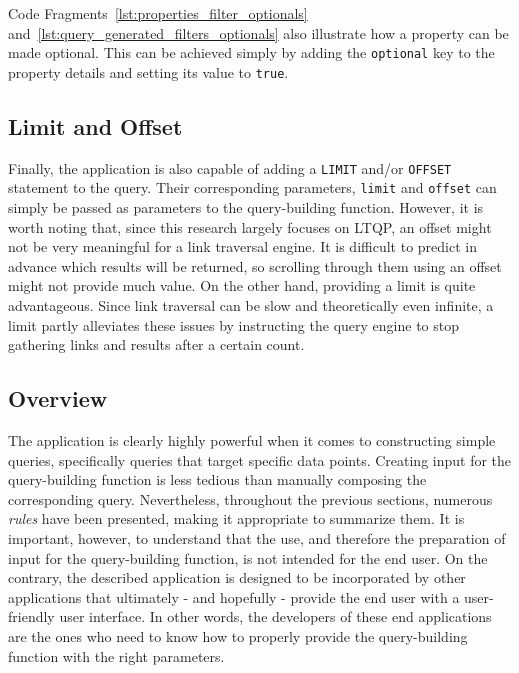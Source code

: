 Code Fragments~\ref{lst:properties_filter_optionals} and~\ref{lst:query_generated_filters_optionals} also illustrate how a property can be made optional. This can be achieved simply by adding the \texttt{optional} key to the property details and setting its value to \texttt{true}.

\subsection{Limit and Offset}
\label{subsec:limit_offset}

Finally, the application is also capable of adding a \texttt{LIMIT} and/or \texttt{OFFSET} statement to the query. Their corresponding parameters, \texttt{limit} and \texttt{offset} can simply be passed as parameters to the query-building function. However, it is worth noting that, since this research largely focuses on LTQP, an offset might not be very meaningful for a link traversal engine. It is difficult to predict in advance which results will be returned, so scrolling through them using an offset might not provide much value. On the other hand, providing a limit is quite advantageous. Since link traversal can be slow and theoretically even infinite, a limit partly alleviates these issues by instructing the query engine to stop gathering links and results after a certain count.

\subsection{Overview}
\label{subsec:building_queries_predicate_sequences_overview}

The application is clearly highly powerful when it comes to constructing simple queries, specifically queries that target specific data points. Creating input for the query-building function is less tedious than manually composing the corresponding query. Nevertheless, throughout the previous sections, numerous \textit{rules} have been presented, making it appropriate to summarize them. It is important, however, to understand that the use, and therefore the preparation of input for the query-building function, is not intended for the end user. On the contrary, the described application is designed to be incorporated by other applications that ultimately - and hopefully - provide the end user with a user-friendly user interface. In other words, the developers of these end applications are the ones who need to know how to properly provide the query-building function with the right parameters.

